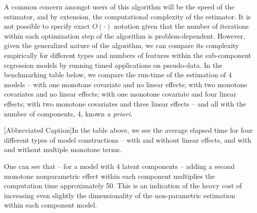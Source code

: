 \documentclass[10pt]{olplainarticle}\usepackage[]{graphicx}\usepackage[]{color}
\begin{document}
A common concern amongst users of this algorithm will be the speed of the estimator, and by extension, the computational complexity of the estimator. It is not possible to specify exact $O(\cdot)$ notation given that the number of iterations within each optimization step of the algorithm is problem-dependent. However, given the generalized nature of the algorithm, we can compare its complexity empirically for different types and numbers of features within the sub-component regression models by running timed applications on pseudo-data. In the benchmarking table below, we compare the run-time of the estimation of 4 models -- with one monotone covariate and no linear effects; with two monotone covariates and no linear effects; with one monotone covariate and four linear effects; with two monotone covariates and three linear effects -- and all with the number of components, 4, known \emph{a priori}.


\begin{minipage}{0.8\textwidth}

[Abbreviated Caption]{In the table above, we see the average elapsed time for four different types of model constructions -- with and without linear effects, and with and without multiple monotone terms.}
\end{minipage}

One can see that -- for a model with 4 latent components -- adding a second monotone nonparametric effect within each component multiplies the computation time approximately 50. This is an indication of the heavy cost of increasing even slightly the dimensionality of the non-parametric estimation within each component model.
\end{document}
